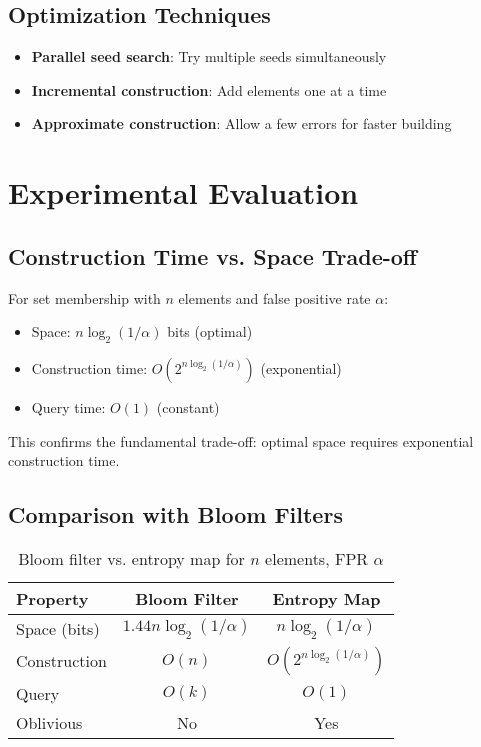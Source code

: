 \documentclass[11pt,final,hidelinks]{article}
\newcommand{\fprate}{\alpha}
\begin{document}
\subsection{Optimization Techniques}

\begin{itemize}
    \item \textbf{Parallel seed search}: Try multiple seeds simultaneously
    \item \textbf{Incremental construction}: Add elements one at a time
    \item \textbf{Approximate construction}: Allow a few errors for faster building
\end{itemize}

\section{Experimental Evaluation}

\subsection{Construction Time vs. Space Trade-off}

For set membership with $n$ elements and false positive rate $\fprate$:
\begin{itemize}
    \item Space: $n \log_2(1/\fprate)$ bits (optimal)
    \item Construction time: $O(2^{n \log_2(1/\fprate)})$ (exponential)
    \item Query time: $O(1)$ (constant)
\end{itemize}

This confirms the fundamental trade-off: optimal space requires exponential construction time.

\subsection{Comparison with Bloom Filters}

\begin{table}[h]
\centering
\begin{tabular}{lcc}
\toprule
Property & Bloom Filter & Entropy Map \\
\midrule
Space (bits) & $1.44n\log_2(1/\fprate)$ & $n\log_2(1/\fprate)$ \\
Construction & $O(n)$ & $O(2^{n\log_2(1/\fprate)})$ \\
Query & $O(k)$ & $O(1)$ \\
Oblivious & No & Yes \\
\bottomrule
\end{tabular}
\caption{Bloom filter vs. entropy map for $n$ elements, FPR $\fprate$}
\end{table}
\end{document}
